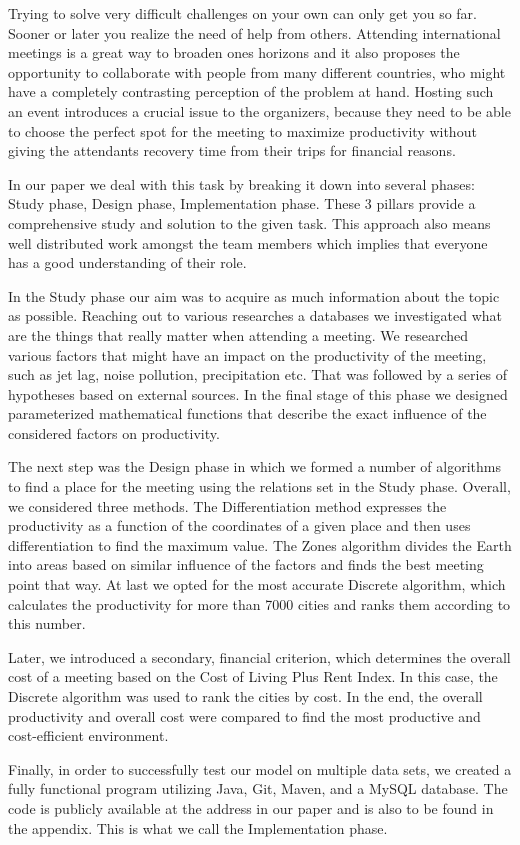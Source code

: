 
Trying to solve very difficult challenges on your own can only get you so far. Sooner or later you realize the need of help from others. Attending international meetings is a great way to broaden ones horizons and it also proposes the opportunity to collaborate with people from many different countries, who might have a completely contrasting perception of the problem at hand. Hosting such an event introduces a crucial issue to the organizers, because they need to be able to choose the perfect spot for the meeting to maximize productivity without giving the attendants recovery time from their trips for financial reasons.

In our paper we deal with this task by breaking it down into several phases: Study phase, Design phase, Implementation phase. These 3 pillars provide a comprehensive study and solution to the given task. This approach also means well distributed work amongst the team members which implies that everyone has a good understanding of their role.

In the Study phase our aim was to acquire as much information about the topic as possible. Reaching out to various researches a databases we investigated what are the things that really matter when attending a meeting. We researched various factors that might have an impact on the productivity of the meeting, such as jet lag, noise pollution, precipitation etc. That was followed by a series of hypotheses based on external sources. In the final stage of this phase we designed parameterized mathematical functions that describe the exact influence of the considered factors on productivity.

The next step was the Design phase in which we formed a number of algorithms to find a place for the meeting using the relations set in the Study phase. Overall, we considered three methods. The Differentiation method expresses the productivity as a function of the coordinates of a given place and then uses differentiation to find the maximum value. The Zones algorithm divides the Earth into areas based on similar influence of the factors and finds the best meeting point that way. At last we opted for the most accurate Discrete algorithm, which calculates the productivity for more than 7000 cities and ranks them according to this number.

Later, we introduced a secondary, financial criterion, which determines the overall cost of a meeting based on the Cost of Living Plus Rent Index. In this case, the Discrete algorithm was used to rank the cities by cost. In the end, the overall productivity and overall cost were compared to find the most productive and cost-efficient environment.

Finally, in order to successfully test our model on multiple data sets, we created a fully functional program utilizing Java, Git, Maven, and a MySQL database. The code is publicly available at the address in our paper and is also to be found in the appendix. This is what we call the Implementation phase.


